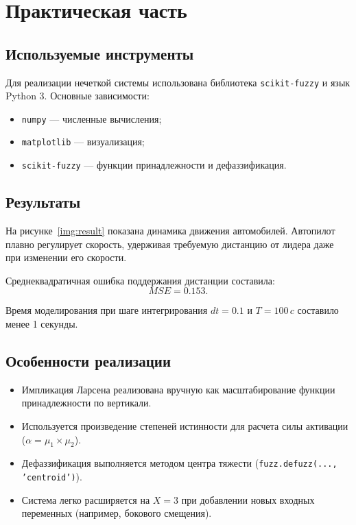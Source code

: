 \chapter{Практическая часть}

\section{Используемые инструменты}

Для реализации нечеткой системы использована библиотека \texttt{scikit-fuzzy} и язык Python 3.  
Основные зависимости:
\begin{itemize}
    \item \texttt{numpy} — численные вычисления;
    \item \texttt{matplotlib} — визуализация;
    \item \texttt{scikit-fuzzy} — функции принадлежности и дефаззификация.
\end{itemize}

\section{Результаты}

На рисунке~\ref{img:result} показана динамика движения автомобилей.  
Автопилот плавно регулирует скорость, удерживая требуемую дистанцию от лидера даже при изменении его скорости.


Среднеквадратичная ошибка поддержания дистанции составила:
\[
MSE = 0.153.
\]

Время моделирования при шаге интегрирования \( dt = 0.1 \) и \( T = 100 \, c \) составило менее 1 секунды.

\section{Особенности реализации}

\begin{itemize}
    \item Импликация Ларсена реализована вручную как масштабирование функции принадлежности по вертикали.
    \item Используется произведение степеней истинности для расчета силы активации (\( \alpha = \mu_1 \times \mu_2 \)).
    \item Дефаззификация выполняется методом центра тяжести (\texttt{fuzz.defuzz(..., 'centroid')}).
    \item Система легко расширяется на \( X=3 \) при добавлении новых входных переменных (например, бокового смещения).
\end{itemize}
